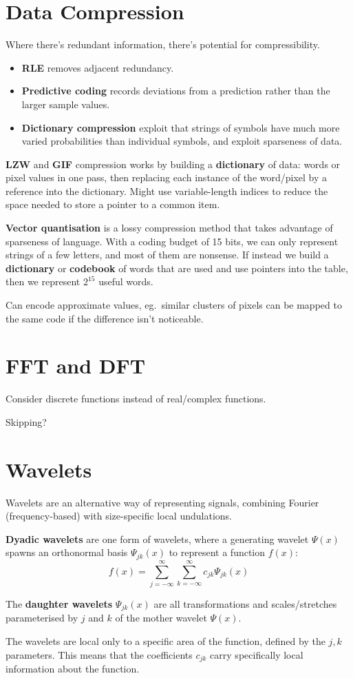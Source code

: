 \documentclass[a4paper, 11pt]{article}
\begin{document}
\section*{Data Compression}
{
    Where there's redundant information, there's potential for compressibility.
    
    \begin{itemize}
    \item \textbf{RLE} removes adjacent redundancy.
    \item \textbf{Predictive coding} records deviations from a prediction rather than the larger sample values.
    \item \textbf{Dictionary compression} exploit that strings of symbols have much more varied probabilities than individual symbols, and exploit sparseness of data.
    \end{itemize}

    \textbf{LZW} and \textbf{GIF} compression works by building a \textbf{dictionary} of data: words or pixel values in one pass, then replacing each instance of the word/pixel by a reference into the dictionary. Might use variable-length indices to reduce the space needed to store a pointer to a common item.

    \textbf{Vector quantisation} is a lossy compression method that takes advantage of sparseness of language. With a coding budget of 15 bits, we can only represent strings of a few letters, and most of them are nonsense. If instead we build a \textbf{dictionary} or \textbf{codebook} of words that are used and use pointers into the table, then we represent \(2^{15}\) useful words.

    Can encode approximate values, eg.\ similar clusters of pixels can be mapped to the same code if the difference isn't noticeable.
}
\section*{FFT and DFT}
{
    Consider discrete functions instead of real/complex functions. 

    Skipping?
}
\section*{Wavelets}
{
    Wavelets are an alternative way of representing signals, combining Fourier (frequency-based) with size-specific local undulations.

    \textbf{Dyadic wavelets} are one form of wavelets, where a generating wavelet \(\Psi(x)\) spawns an orthonormal basis \(\Psi_{jk}(x)\) to represent a function \(f(x)\):
    \[f(x) = \sum_{j=-\infty}^\infty \sum_{k=-\infty}^\infty c_{jk}\Psi_{jk}(x)\]

    The \textbf{daughter wavelets} \(\Psi_{jk}(x)\) are all transformations and scales/stretches parameterised by \(j\) and \(k\) of the mother wavelet \(\Psi(x)\).

    The wavelets are local only to a specific area of the function, defined by the \(j,k\) parameters. This means that the coefficients \(c_{jk}\) carry specifically local information about the function.
}
\end{document}
